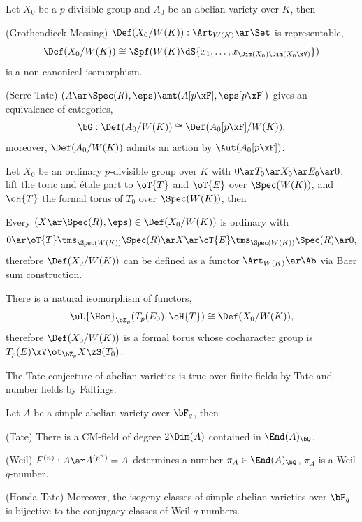 \documentclass[a4paper, twoside]{article}
\begin{document}
\begin{thm}[{\cite[2.5, 2.8]{CO2009}}]
	Let $X_{0}$ be a $p$-divisible group and $A_{0}$ be an abelian variety over $K$, then
	\begin{enr}
		\item (Grothendieck-Messing) $\Def(X_{0}/W(K)):\Art_{W(K)}\ar\Set$ is representable,
		\[
			\Def(X_{0}/W(K))\cong\Spf(W(K)\dS{x_{1},\ldots,x_{\Dim(X_{0})\Dim(X_{0}\xV)}})
		\]
		is a non-canonical isomorphism.
		\item (Serre-Tate) $(A\ar\Spec(R),\eps)\amt(A[p\xF],\eps[p\xF])$ gives an equivalence of categories,
		\[
			\bG:\Def(A_{0}/W(K))\cong\Def(A_{0}[p\xF]/W(K)),
		\]
		moreover, $\Def(A_{0}/W(K))$ admits an action by $\Aut(A_{0}[p\xF])$.
	\end{enr}
\end{thm}

\begin{thm}[{\cite[2.19]{CO2009}}]
	Let $X_{0}$ be an ordinary $p$-divisible group over $K$ with $0\ar T_{0}\ar X_{0}\ar E_{0}\ar 0$, lift the toric and {\'e}tale part to $\oT{T}$ and $\oT{E}$ over $\Spec(W(K))$, and $\oH{T}$ the formal torus of $T_{0}$ over $\Spec(W(K))$, then
	\begin{enr}
		\item Every $(X\ar\Spec(R),\eps)\in\Def(X_{0}/W(K))$ is ordinary with
		\[
			0\ar\oT{T}\tms_{\Spec(W(K))}\Spec(R)\ar X\ar \oT{E}\tms_{\Spec(W(K))}\Spec(R)\ar 0,
		\]
		therefore $\Def(X_{0}/W(K))$ can be defined as a functor $\Art_{W(K)}\ar\Ab$ via Baer sum construction.
		\item There is a natural isomorphism of functors,
		\[
			\uL{\Hom}_{\bZ_{p}}(T_{p}(E_{0}),\oH{T})\cong\Def(X_{0}/W(K)),
		\]
		therefore $\Def(X_{0}/W(K))$ is a formal torus whose cocharacter group is $T_{p}(E)\xV\ot_{\bZ_{p}}X\zS(T_{0})$.
	\end{enr}
\end{thm}

\begin{ups}
	The Tate conjecture of abelian varieties is true over finite fields by Tate and number fields by Faltings.
\end{ups}

\begin{thm}[{\cite[3.3, 3.9, 3.12]{CO2009}}]
	Let $A$ be a simple abelian variety over $\bF_{q}$, then
		\begin{enr}
			\item (Tate) There is a CM-field of degree $2\Dim(A)$ contained in $\End(A)_{\bQ}$.
			\item (Weil) $F^{(n)}:A\ar A^{(p^{n})}=A$ determines a number $\pi_{A}\in\End(A)_{\bQ}$, $\pi_{A}$ is a Weil $q$-number.
		\end{enr}
	(Honda-Tate) Moreover, the isogeny classes of simple abelian varieties over $\bF_{q}$ is bijective to the conjugacy classes of Weil $q$-numbers.
\end{thm}
\end{document}
